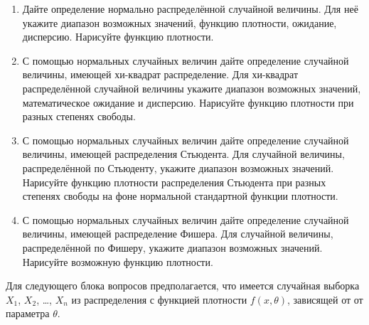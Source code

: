\begin{enumerate}
  \item Дайте определение нормально распределённой случайной величины.
	Для неё укажите диапазон возможных значений, функцию плотности, ожидание, дисперсию.
	Нарисуйте функцию плотности.
  \item С помощью нормальных случайных величин дайте определение случайной величины, имеющей хи-квадрат распределение. 
	Для хи-квадрат распределённой случайной величины укажите диапазон возможных значений,
	математическое ожидание и дисперсию.
	Нарисуйте функцию плотности при разных степенях свободы.
  \item С помощью нормальных случайных величин дайте определение случайной величины, имеющей распределения Стьюдента.
	Для случайной величины, распределённой по Стьюденту, укажите диапазон возможных значений.
	Нарисуйте функцию плотности распределения Стьюдента при разных степенях свободы
	на фоне нормальной стандартной функции плотности.
  \item С помощью нормальных случайных величин дайте определение случайной величины, имеющей распределение Фишера. 
    Для случайной величины, распределённой по Фишеру, укажите диапазон возможных значений.
	Нарисуйте возможную функцию плотности.
\end{enumerate}

Для следующего блока вопросов предполагается, что
имеется случайная выборка $X_1$, $X_2$, \ldots, $X_n$ из распределения
с функцией плотности $f(x, \theta)$, зависящей от от параметра $\theta$.

